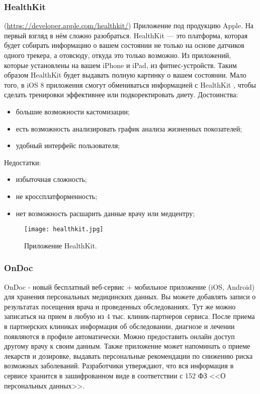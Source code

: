 \subsubsection{HealthKit}(\url{https://developer.apple.com/healthkit/}) 
Приложение под продукцию Apple. На первый взгляд в нём сложно разобраться. HealthKit — это платформа, которая будет собирать информацию о вашем состоянии не только на основе датчиков одного трекера, а отовсюду, откуда это только возможно. Из приложений, которые установлены на вашем iPhone и iPad, из фитнес-устройств. Таким образом HealthKit будет выдавать полную картинку о вашем состоянии. Мало того, в iOS 8 приложения смогут обмениваться информацией с HealthKit , чтобы сделать тренировки эффективнее или подкоректировать диету.
Достоинства:
\begin{itemize}
  \item большие возможности кастомизации;
  \item есть возможность анализировать график анализа жизненных покозателей;
  \item удобный интерфейс пользователя;
\end{itemize}
Недостатки:
\begin{itemize}
  \item избыточная сложность;
  \item не кроссплатформенность;
  \item нет возможность расшарить данные врачу или медцентру;
\end{itemize}

\begin{figure}[ht]
\centering
  \texttt{[image: healthkit.jpg]}  
  \caption{ Приложение HealthKit. }
  \label{fig:domain:manual_structure:credit_healthkit}
\end{figure}

\subsubsection{OnDoc }
\label{sub:domain:existing_programs:genie}

OnDoc - новый бесплатный веб-сервис + мобильное приложение (iOS, Android) для хранения персональных медицинских данных. Вы можете добавлять записи о результатах посещения врача и проведенных обследованиях. Тут же можно записаться на прием в любую из 4 тыс. клиник-партнеров сервиса. После приема в партнерских клиниках информация об обследовании, диагнозе и лечении появляются в профиле автоматически. Можно предоставить онлайн доступ другому врачу к своим данным. Также приложение может напоминать о приеме лекарств и дозировке, выдавать персональные рекомендации по снижению риска возможных заболеваний. Разработчики утверждают, что вся информация в сервисе хранится в зашифрованном виде в соответствии с 152 ФЗ <<О персональных данных>>.


